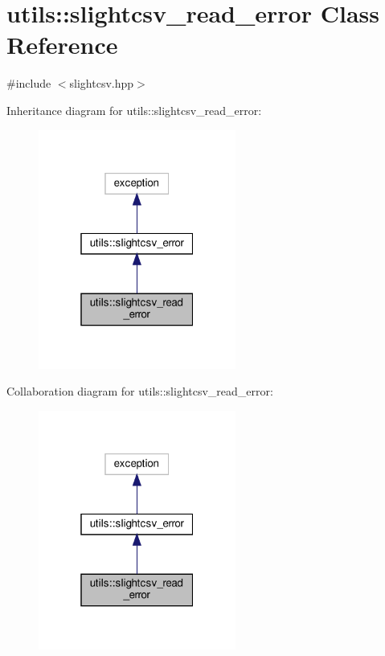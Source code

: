 \hypertarget{classutils_1_1slightcsv__read__error}{}\section{utils\+:\+:slightcsv\+\_\+read\+\_\+error Class Reference}
\label{classutils_1_1slightcsv__read__error}


{\ttfamily \#include $<$slightcsv.\+hpp$>$}



Inheritance diagram for utils\+:\+:slightcsv\+\_\+read\+\_\+error\+:
\nopagebreak
\begin{figure}[H]
\begin{center}
\leavevmode
\includegraphics[width=184pt]{classutils_1_1slightcsv__read__error__inherit__graph}
\end{center}
\end{figure}


Collaboration diagram for utils\+:\+:slightcsv\+\_\+read\+\_\+error\+:
\nopagebreak
\begin{figure}[H]
\begin{center}
\leavevmode
\includegraphics[width=184pt]{classutils_1_1slightcsv__read__error__coll__graph}
\end{center}
\end{figure}


